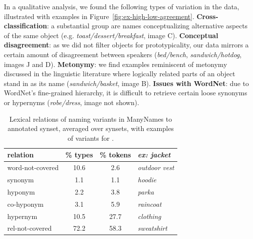 
In a qualitative analysis, we found the following types of variation in the data, illustrated with examples in Figure~\ref{fig:ex-high-low-agreement}.
\textbf{Cross-classification}: a substantial group are names conceptualizing alternative aspects of the same object (e.g. \textit{toast/dessert/breakfast}, image C).
\textbf{Conceptual disagreement}: as we did not filter objects for prototypicality, our data mirrors a certain amount of disagreement between speakers (\textit{bed/bench}, \textit{sandwich/hotdog}, images J and D).
\textbf{Metonymy}: we find examples reminiscent of metonymy discussed in the linguistic literature \cite{pustejovsky1991generative} where logically related parts of an object stand in as its name (\textit{sandwich/basket}, image B). 
\textbf{Issues with WordNet}: due to WordNet's fine-grained hierarchy, it is difficult to retrieve certain loose synonyms or hypernyms (\textit{robe/dress}, image not shown).
%
\begin{table}[t]
\centering
\setlength{\tabcolsep}{2pt}
\begin{tabular}{lcc|p{2.5cm}}
\toprule
         relation & \% types & \% tokens & \it ex: jacket \\
\midrule
 word-not-covered &  10.6 &  2.6 & \it outdoor vest\\
\midrule
 synonym &  1.1 &  1.1 & \it hoodie  \\
 hyponym &  2.2 &  3.8 & \it parka\\ %
 co-hyponym &  3.1 &  5.9 & \it raincoat\\
 hypernym &  10.5 &  27.7 & \it clothing \\%
 rel-not-covered &  72.2 &  58.3 & \it sweatshirt\\%
\bottomrule
\end{tabular}
\caption{Lexical relations of naming variants in ManyNames to annotated \vg synset, averaged over synsets, with examples of variants for .}
\label{tab:rel}
\vspace{-0.5cm}
\end{table}


